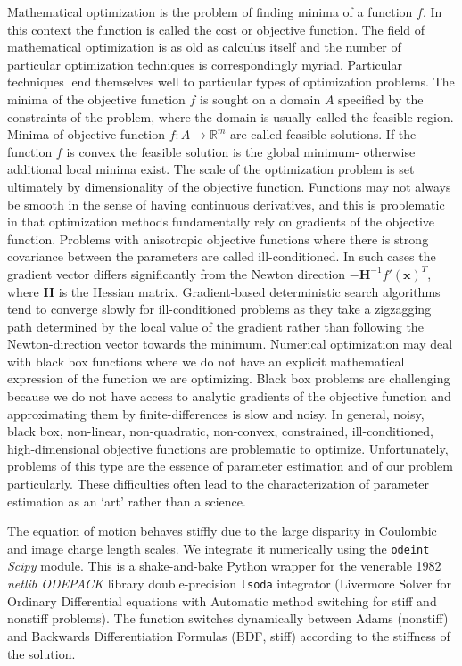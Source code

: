 \documentclass[12pt,a4paper,oneside]{book}
\begin{document}
Mathematical optimization is the problem of finding minima of a function $f$. In this context the function is called the cost or objective function. The field of mathematical optimization is as old as calculus itself and the number of particular optimization techniques is correspondingly myriad. Particular techniques lend themselves well to particular types of optimization problems. The minima of the objective function $f$ is sought on a domain $A$ specified by the constraints of the problem, where the domain is usually called the feasible region. Minima of objective function $f: A \rightarrow \mathbb{R}^m$ are called feasible solutions. If the function $f$ is convex the feasible solution is the global minimum- otherwise additional local minima exist. The scale of the optimization problem is set ultimately by dimensionality of the objective function. Functions may not always be smooth in the sense of having continuous derivatives, and this is problematic in that optimization methods fundamentally rely on gradients of the objective function. Problems with anisotropic objective functions where there is strong covariance between the parameters are called ill-conditioned. In such cases the gradient vector differs significantly from the Newton direction $-\mathbf{H}^{-1} f' ( \mathbf{x} )^T$, where $\mathbf{H}$ is the Hessian matrix. Gradient-based deterministic search algorithms tend to converge slowly for ill-conditioned problems as they take a zigzagging path determined by the local value of the gradient rather than following the Newton-direction vector towards the minimum. Numerical optimization may deal with black box functions where we do not have an explicit mathematical expression of the function we are optimizing. Black box problems are challenging because we do not have access to analytic gradients of the objective function and approximating them by finite-differences is slow and noisy. In general, noisy, black box, non-linear, non-quadratic, non-convex, constrained, ill-conditioned, high-dimensional objective functions are problematic to optimize. Unfortunately, problems of this type are the essence of parameter estimation and of our problem particularly. These difficulties often lead to the characterization of parameter estimation as an `art' rather than a science.   

The equation of motion behaves stiffly due to the large disparity in Coulombic and image charge length scales. We integrate it numerically using the \verb|odeint| \emph{Scipy} module. This is a shake-and-bake Python wrapper for the venerable 1982 \emph{netlib ODEPACK} library double-precision \verb|lsoda| integrator \cite{hindmarsh_odepack_1983} (Livermore Solver for Ordinary Differential equations with Automatic method switching for stiff and nonstiff problems). The function switches dynamically between Adams (nonstiff) and Backwards Differentiation Formulas (BDF, stiff) according to the stiffness of the solution.
\end{document}

